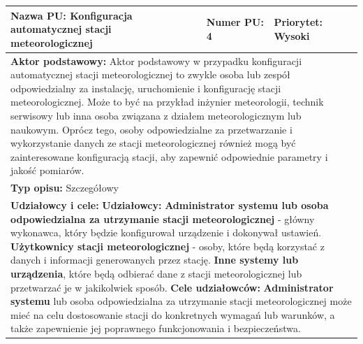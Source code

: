 \documentclass{article}
\begin{document}
\begin{center}
    \begin{center}
        \begin{tabular}{|l|l|l|}
        \hline
        \textbf{Nazwa PU:} Konfiguracja automatycznej stacji meteorologicznej & \textbf{Numer PU:} 4 & \textbf{Priorytet:} Wysoki \\
        \hline
        \hline
        \multicolumn{3}{|p{\dimexpr\linewidth-2\tabcolsep-2\arrayrulewidth}|}{\textbf{Aktor podstawowy:}
        \newline 
        Aktor podstawowy w przypadku konfiguracji automatycznej stacji meteorologicznej to zwykle osoba
        lub zespół odpowiedzialny za instalację, uruchomienie i konfigurację stacji meteorologicznej.
        Może to być na przykład inżynier meteorologii, technik serwisowy lub inna osoba związana z działem
        meteorologicznym lub naukowym. Oprócz tego, osoby odpowiedzialne za przetwarzanie i wykorzystanie
        danych ze stacji meteorologicznej również mogą być zainteresowane konfiguracją stacji,
        aby zapewnić odpowiednie parametry i jakość pomiarów.} \\
        \hline
        \hline
        \multicolumn{3}{|p{\dimexpr\linewidth-2\tabcolsep-2\arrayrulewidth}|}{\textbf{Typ opisu:} Szczegółowy} \\
        \hline
        \hline
        \multicolumn{3}{|p{\dimexpr\linewidth-2\tabcolsep-2\arrayrulewidth}|}{\textbf{Udziałowcy i cele:}
        \newline
        \textbf{Udziałowcy:} 
        \newline
        \textbf{Administrator systemu lub osoba odpowiedzialna za utrzymanie stacji meteorologicznej} - główny wykonawca, który będzie konfigurował urządzenie i dokonywał ustawień.
        \newline
        \textbf{Użytkownicy stacji meteorologicznej} - osoby, które będą korzystać z danych i informacji generowanych przez stację.
        \newline
        \textbf{Inne systemy lub urządzenia}, które będą odbierać dane z stacji meteorologicznej lub przetwarzać je w jakikolwiek sposób.
        \newline 
        \textbf{Cele udziałowców:}
        \newline
        \textbf{Administrator systemu} lub osoba odpowiedzialna za utrzymanie stacji meteorologicznej może mieć na celu dostosowanie stacji do konkretnych wymagań lub warunków, a także zapewnienie jej poprawnego funkcjonowania i bezpieczeństwa.
        \newline
}
\end{tabular}
\end{center}
\end{center}
\end{document}
